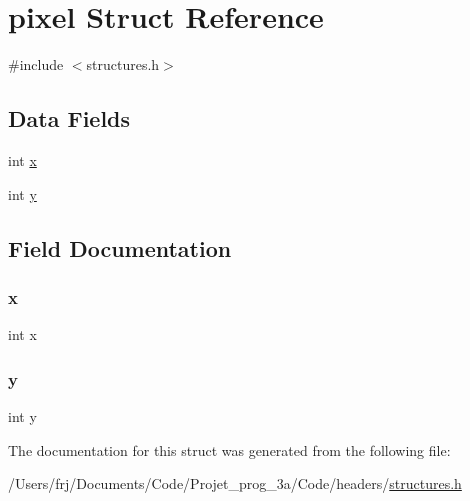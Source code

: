 \hypertarget{structpixel}{}\section{pixel Struct Reference}
\label{structpixel}


{\ttfamily \#include $<$structures.\+h$>$}

\subsection*{Data Fields}
\begin{DoxyCompactItemize}
\item 
int \hyperlink{structpixel_a6150e0515f7202e2fb518f7206ed97dc}{x}
\item 
int \hyperlink{structpixel_a0a2f84ed7838f07779ae24c5a9086d33}{y}
\end{DoxyCompactItemize}


\subsection{Field Documentation}
\hypertarget{structpixel_a6150e0515f7202e2fb518f7206ed97dc}{}\label{structpixel_a6150e0515f7202e2fb518f7206ed97dc} 
\subsubsection{\texorpdfstring{x}{x}}
{\footnotesize\ttfamily int x}

\hypertarget{structpixel_a0a2f84ed7838f07779ae24c5a9086d33}{}\label{structpixel_a0a2f84ed7838f07779ae24c5a9086d33} 
\subsubsection{\texorpdfstring{y}{y}}
{\footnotesize\ttfamily int y}



The documentation for this struct was generated from the following file\+:\begin{DoxyCompactItemize}
\item 
/\+Users/frj/\+Documents/\+Code/\+Projet\+\_\+prog\+\_\+3a/\+Code/headers/\hyperlink{structures_8h}{structures.\+h}\end{DoxyCompactItemize}
